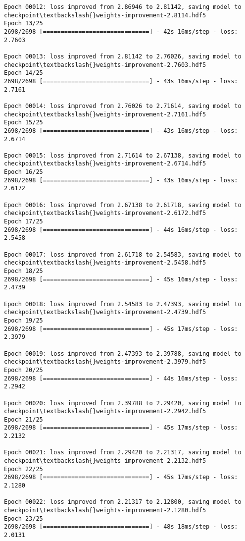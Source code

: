 \documentclass[11pt]{article}
\begin{document}
\begin{Verbatim}[commandchars=\\\{\}]
Epoch 00012: loss improved from 2.86946 to 2.81142, saving model to
checkpoint\textbackslash{}weights-improvement-2.8114.hdf5
Epoch 13/25
2698/2698 [==============================] - 42s 16ms/step - loss: 2.7603

Epoch 00013: loss improved from 2.81142 to 2.76026, saving model to
checkpoint\textbackslash{}weights-improvement-2.7603.hdf5
Epoch 14/25
2698/2698 [==============================] - 43s 16ms/step - loss: 2.7161

Epoch 00014: loss improved from 2.76026 to 2.71614, saving model to
checkpoint\textbackslash{}weights-improvement-2.7161.hdf5
Epoch 15/25
2698/2698 [==============================] - 43s 16ms/step - loss: 2.6714

Epoch 00015: loss improved from 2.71614 to 2.67138, saving model to
checkpoint\textbackslash{}weights-improvement-2.6714.hdf5
Epoch 16/25
2698/2698 [==============================] - 43s 16ms/step - loss: 2.6172

Epoch 00016: loss improved from 2.67138 to 2.61718, saving model to
checkpoint\textbackslash{}weights-improvement-2.6172.hdf5
Epoch 17/25
2698/2698 [==============================] - 44s 16ms/step - loss: 2.5458

Epoch 00017: loss improved from 2.61718 to 2.54583, saving model to
checkpoint\textbackslash{}weights-improvement-2.5458.hdf5
Epoch 18/25
2698/2698 [==============================] - 45s 16ms/step - loss: 2.4739

Epoch 00018: loss improved from 2.54583 to 2.47393, saving model to
checkpoint\textbackslash{}weights-improvement-2.4739.hdf5
Epoch 19/25
2698/2698 [==============================] - 45s 17ms/step - loss: 2.3979

Epoch 00019: loss improved from 2.47393 to 2.39788, saving model to
checkpoint\textbackslash{}weights-improvement-2.3979.hdf5
Epoch 20/25
2698/2698 [==============================] - 44s 16ms/step - loss: 2.2942

Epoch 00020: loss improved from 2.39788 to 2.29420, saving model to
checkpoint\textbackslash{}weights-improvement-2.2942.hdf5
Epoch 21/25
2698/2698 [==============================] - 45s 17ms/step - loss: 2.2132

Epoch 00021: loss improved from 2.29420 to 2.21317, saving model to
checkpoint\textbackslash{}weights-improvement-2.2132.hdf5
Epoch 22/25
2698/2698 [==============================] - 45s 17ms/step - loss: 2.1280

Epoch 00022: loss improved from 2.21317 to 2.12800, saving model to
checkpoint\textbackslash{}weights-improvement-2.1280.hdf5
Epoch 23/25
2698/2698 [==============================] - 48s 18ms/step - loss: 2.0131


\end{Verbatim}
\end{document}
